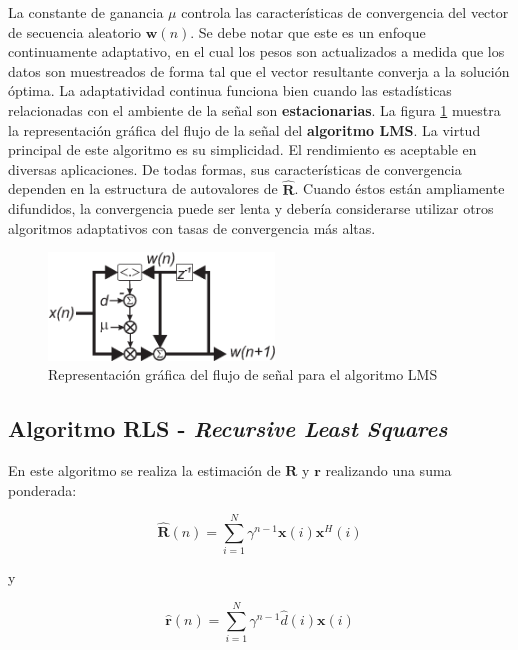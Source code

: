 La constante de ganancia $\mu$ controla las características de convergencia del vector de secuencia aleatorio $\mathbf{w}(n)$. Se debe notar que este es un enfoque continuamente adaptativo, en el cual los pesos son actualizados a medida que los datos son muestreados de forma tal que el vector resultante converja a la solución óptima. La adaptatividad continua funciona bien cuando las estadísticas relacionadas con el ambiente de la señal son \textbf{estacionarias}. La figura \ref{fig:lms_algorithm} muestra la representación gráfica del flujo de la señal del \textbf{algoritmo LMS}. La virtud principal de este algoritmo es su simplicidad. El rendimiento es aceptable en diversas aplicaciones. De todas formas, sus características de convergencia dependen en la estructura de autovalores de $\mathbf{\hat{R}}$. Cuando éstos están ampliamente difundidos, la convergencia puede ser lenta y debería considerarse utilizar otros algoritmos adaptativos con tasas de convergencia más altas.

\begin{figure}[htb!]
        \centering
        \includegraphics[width=6cm]{./figures/C02-lms_signal_flow}
        \caption{Representación gráfica del flujo de señal para el algoritmo LMS}
        \label{fig:lms_algorithm}
\end{figure}

\subsection{Algoritmo RLS - \textit{Recursive Least Squares}}

En este algoritmo se realiza la estimación de $\mathbf{R}$ y $\mathbf{r}$ realizando una suma ponderada:

\begin{equation}
\mathbf{\hat{R}}(n) = \sum_{i=1}^N \gamma^{n-1} \mathbf{x}(i) \mathbf{x}^H(i)
\label{estimate_R}
\end{equation}

y

\begin{equation}
\mathbf{\hat{r}}(n) = \sum_{i=1}^N \gamma^{n-1} \hat{d}(i) \mathbf{x}(i)
\label{estimate_r}
\end{equation}

